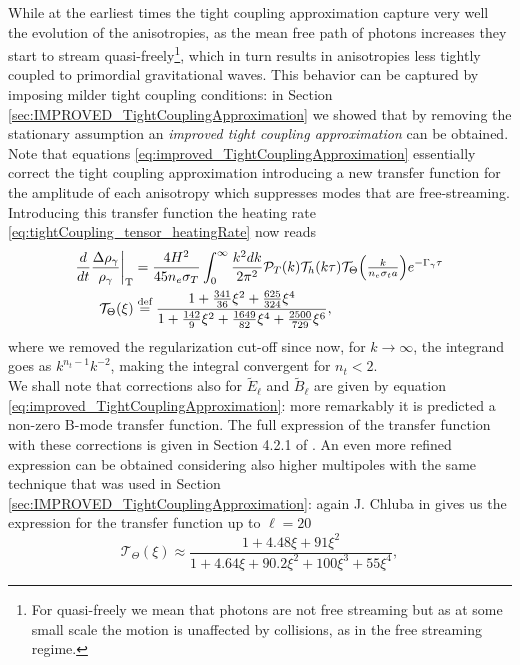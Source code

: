 While at the earliest times the tight coupling approximation capture very well the evolution of the anisotropies, as the mean free path of photons increases they start to stream quasi-freely\footnote{For quasi-freely we mean that photons are not free streaming but as at some small scale the motion is unaffected by collisions, as in the free streaming regime.}, which in turn results in anisotropies less tightly coupled to primordial gravitational waves. This behavior can be captured by imposing milder tight coupling conditions: in Section \ref{sec:IMPROVED_TightCouplingApproximation} we showed that by removing the stationary assumption an \emph{improved tight coupling approximation} can be obtained. Note that equations \eqref{eq:improved_TightCouplingApproximation} essentially correct the tight coupling approximation introducing a new transfer function for the amplitude of each anisotropy which suppresses modes that are free-streaming. Introducing this transfer function the heating rate \eqref{eq:tightCoupling_tensor_heatingRate} now reads
\begin{align}\label{eq:impTightCoupling_tensor_heatingRate}
         \frac{d}{dt}\frac{\Delta\rho_\gamma}{\rho_\gamma}\bigg|_\text{T}&=\frac{4H^2}{45n_e\sigma_T}\int_0^{\infty}\frac{k^2dk}{2\pi^2}\mathcal{P}_T (k)\mathcal{T}_h(k\tau)\mathcal{T}_\Theta \Big(\tfrac{k}{n_e\sigma_ta}\Big)e^{-\Gamma_\gamma\tau}\\
    \mathcal{T}_\Theta(\xi)&\stackrel{\text{def}}{=} \frac{1+\frac{341}{36}\xi^2+\frac{625}{324}\xi^4}{1+\frac{142}{9}\xi^2+\frac{1649}{82}\xi^4+\frac{2500}{729}\xi^6},\nonumber
\end{align}
where we removed the regularization cut-off since now, for $k\to\infty$, the integrand goes as $k^{n_t-1}k^{-2}$, making the integral convergent for $n_t<2$.\\ We shall note that corrections also for $\tilde E_\ell$ and $\tilde B_\ell$ are given by equation \eqref{eq:improved_TightCouplingApproximation}: more remarkably it is predicted a non-zero B-mode transfer function. The full expression of the transfer function with these corrections is given in Section 4.2.1 of \cite{Chluba_tens_diss}.
An even more refined expression can be obtained considering also higher multipoles with the same technique that was used in Section \ref{sec:IMPROVED_TightCouplingApproximation}: again J. Chluba in \cite{Chluba_tens_diss} gives us the expression for the transfer function up to $\ell=20$
\begin{equation}
    \mathcal{T}_\Theta(\xi)\approx\frac{1+4.48\xi+91\xi^2}{1+4.64\xi+90.2\xi^2+100\xi^3+55\xi^4},\label{eq:improved_THETA_Transfer}
\end{equation} 
